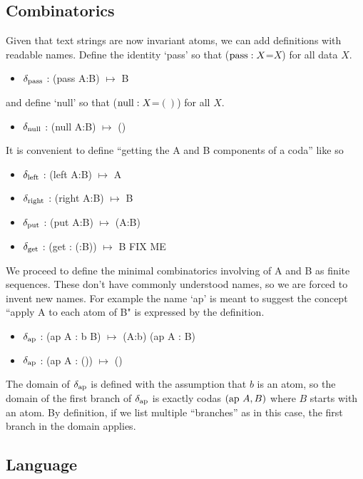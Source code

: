 \documentclass[11pt]{article}
\begin{document}
\subsection{Combinatorics} 

Given that text strings are now invariant atoms, we can add definitions with readable names.  Define the identity `pass' so that (${\rm pass}:X$=$X$) for all data $X$.  
\begin{itemize}
\item{$\delta_{\rm pass}$ : ({\rm pass} A:B) $\mapsto$ B}
\end{itemize}
and define `null' so that (${\rm null}:X$=$()$) for all $X$.
\begin{itemize}
\item{$\delta_{\rm null}$ : ({\rm null} A:B) $\mapsto$ ()}
\end{itemize}
It is convenient to define ``getting the A and B components of a coda'' like so
\begin{itemize}
\item{$\delta_{\rm left}$ : ({\rm left} A:B) $\mapsto$ A} 
\item{$\delta_{\rm right}$ : ({\rm right} A:B) $\mapsto$ B} 
\item{$\delta_{\rm put}$ : ({\rm put} A:B) $\mapsto$ (A:B)}
\item{$\delta_{\rm get}$ : ({\rm get} : (:B)) $\mapsto$ B} FIX ME
\end{itemize}
We proceed to define the minimal combinatorics involving of A and B as finite sequences.  These don't have 
commonly understood names, so we are forced to invent new names.  For example the name `ap' is meant to suggest the 
concept ``apply A to each atom of B" is expressed by the definition.  
\begin{itemize}
\item{$\delta_{\rm ap}$ : ({\rm ap} A : b B) $\mapsto$ (A:b) ({\rm ap} A : B)}
\item{$\delta_{\rm ap}$ : ({\rm ap} A : ()) $\mapsto$ ()} 
\end{itemize} 
The domain of $\delta_{\rm ap}$ is defined with the assumption that $b$ is an atom, so the domain of the first branch of $\delta_{\rm ap}$ is exactly 
codas $({\rm ap}\ A,B)$ where $B$ starts with an atom.  By definition, if we list multiple ``branches'' as in this case, the first branch in the domain applies.  

\subsection{Language} 
\end{document}
